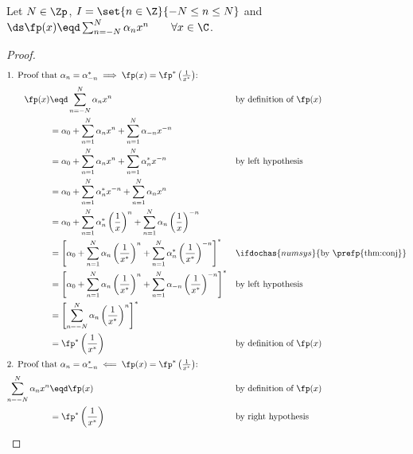 \begin{theorem}
\label{thm:hsym<==>1/x*}
Let $N\in\Zp$, $I=\set{n\in\Z}{-N\le n\le N}$ and 
  $\ds\fp(x) \eqd \sum_{n=-N}^N \alpha_n x^n  \qquad \forall x\in\C$.
\end{theorem}
\begin{proof}
\begin{align*}
\intertext{1. Proof that 
  $\alpha_n=\alpha_{-n}^\ast \implies \fp(x) = \fp^\ast\left(\frac{1}{x^\ast}\right)$:
  }
  \fp(x)
    &\eqd\sum_{n=-N}^N \alpha_n x^n
    &&   \text{by definition of $\fp(x)$}
  \\&=   \alpha_0 + \sum_{n=1}^N \alpha_n x^n + \sum_{n=1}^N \alpha_{-n} x^{-n}
  \\&=   \alpha_0 + \sum_{n=1}^N \alpha_n x^n + \sum_{n=1}^N \alpha_n^\ast x^{-n}
    &&   \text{by left hypothesis}
  \\&=   \alpha_0 + \sum_{n=1}^N \alpha_n^\ast x^{-n} + \sum_{n=1}^N \alpha_n x^n 
  \\&=   \alpha_0 
       + \sum_{n=1}^N \alpha_n^\ast \left(\frac{1}{x}\right)^n 
       + \sum_{n=1}^N \alpha_n \left(\frac{1}{x}\right)^{-n} 
  \\&=   \left[\alpha_0 
       + \sum_{n=1}^N \alpha_n \left(\frac{1}{x^\ast}\right)^n 
       + \sum_{n=1}^N \alpha_n^\ast \left(\frac{1}{x^\ast}\right)^{-n} 
         \right]^\ast
    &&   \ifdochas{numsys}{\text{by \prefp{thm:conj}}}
  \\&=   \left[\alpha_0 
       + \sum_{n=1}^N \alpha_n    \left(\frac{1}{x^\ast}\right)^n 
       + \sum_{n=1}^N \alpha_{-n} \left(\frac{1}{x^\ast}\right)^{-n} 
         \right]^\ast
    &&   \text{by left hypothesis}
  \\&=   \left[
           \sum_{n=-N}^N \alpha_n    \left(\frac{1}{x^\ast}\right)^n 
         \right]^\ast
  \\&= \fp^\ast\left(\frac{1}{x^\ast}\right)
    &&   \text{by definition of $\fp(x)$}
  \\
\intertext{2. Proof that 
  $\alpha_n=\alpha_{-n}^\ast \impliedby \fp(x) = \fp^\ast\left(\frac{1}{x^\ast}\right)$:
  }
  \sum_{n=-N}^N \alpha_n x^n
    &\eqd\fp(x)
    &&   \text{by definition of $\fp(x)$}
  \\&=   \fp^\ast\left(\frac{1}{x^\ast}\right)
    &&   \text{by right hypothesis}

\end{align*}
\end{proof}

